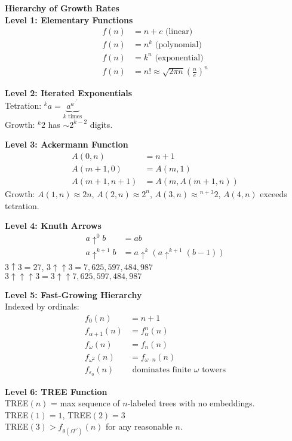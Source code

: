 \begin{technical}
{\Large\textbf{Hierarchy of Growth Rates}}\\[0.7em]

\textbf{Level 1: Elementary Functions}
\begin{align}
f(n) &= n + c \text{ (linear)}\\
f(n) &= n^k \text{ (polynomial)}\\
f(n) &= k^n \text{ (exponential)}\\
f(n) &= n! \approx \sqrt{2\pi n}\left(\frac{n}{e}\right)^n
\end{align}

\textbf{Level 2: Iterated Exponentials}\\
Tetration: ${}^ka = \underbrace{a^{a^{\cdot^{\cdot^{\cdot^a}}}}}_{k \text{ times}}$\\
Growth: ${}^k2$ has $\sim 2^{k-2}$ digits.

\textbf{Level 3: Ackermann Function}
\begin{align}
A(0,n) &= n+1\\
A(m+1,0) &= A(m,1)\\
A(m+1,n+1) &= A(m, A(m+1,n))
\end{align}
Growth: $A(1,n) \approx 2n$, $A(2,n) \approx 2^n$, $A(3,n) \approx {}^{n+3}2$, $A(4,n)$ exceeds tetration.

\textbf{Level 4: Knuth Arrows}
\begin{align}
a \uparrow^0 b &= ab\\
a \uparrow^{k+1} b &= a \uparrow^k (a \uparrow^{k+1} (b-1))
\end{align}
$3 \uparrow 3 = 27$, $3 \uparrow\uparrow 3 = 7{,}625{,}597{,}484{,}987$\\
$3 \uparrow\uparrow\uparrow 3 = 3 \uparrow\uparrow 7{,}625{,}597{,}484{,}987$

\textbf{Level 5: Fast-Growing Hierarchy}\\
Indexed by ordinals:
\begin{align}
f_0(n) &= n+1\\
f_{\alpha+1}(n) &= f_\alpha^n(n)\\
f_\omega(n) &= f_n(n)\\
f_{\omega^2}(n) &= f_{\omega \cdot n}(n)\\
f_{\varepsilon_0}(n) &\text{ dominates finite } \omega \text{ towers}
\end{align}

\textbf{Level 6: TREE Function}\\
TREE$(n)$ = max sequence of $n$-labeled trees with no embeddings.\\
TREE$(1) = 1$, TREE$(2) = 3$\\
TREE$(3) > f_{\theta(\Omega^\omega)}(n)$ for any reasonable $n$.


\end{technical}

